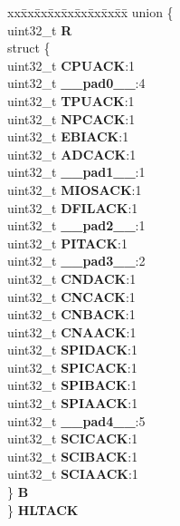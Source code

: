 \begin{DoxyCompactItemize}
\begin{tabbing}
\end{tabbing}\item 
\mbox{\label{structSIU__tag_ae1338aae75922f1d1cc332f99dc2864f}} 
\begin{tabbing}
xx\=xx\=xx\=xx\=xx\=xx\=xx\=xx\=xx\=\kill
union \{\\
\>uint32\_t {\bfseries R}\\
\>struct \{\\
\>\>uint32\_t {\bfseries CPUACK}:1\\
\>\>uint32\_t {\bfseries \_\_pad0\_\_}:4\\
\>\>uint32\_t {\bfseries TPUACK}:1\\
\>\>uint32\_t {\bfseries NPCACK}:1\\
\>\>uint32\_t {\bfseries EBIACK}:1\\
\>\>uint32\_t {\bfseries ADCACK}:1\\
\>\>uint32\_t {\bfseries \_\_pad1\_\_}:1\\
\>\>uint32\_t {\bfseries MIOSACK}:1\\
\>\>uint32\_t {\bfseries DFILACK}:1\\
\>\>uint32\_t {\bfseries \_\_pad2\_\_}:1\\
\>\>uint32\_t {\bfseries PITACK}:1\\
\>\>uint32\_t {\bfseries \_\_pad3\_\_}:2\\
\>\>uint32\_t {\bfseries CNDACK}:1\\
\>\>uint32\_t {\bfseries CNCACK}:1\\
\>\>uint32\_t {\bfseries CNBACK}:1\\
\>\>uint32\_t {\bfseries CNAACK}:1\\
\>\>uint32\_t {\bfseries SPIDACK}:1\\
\>\>uint32\_t {\bfseries SPICACK}:1\\
\>\>uint32\_t {\bfseries SPIBACK}:1\\
\>\>uint32\_t {\bfseries SPIAACK}:1\\
\>\>uint32\_t {\bfseries \_\_pad4\_\_}:5\\
\>\>uint32\_t {\bfseries SCICACK}:1\\
\>\>uint32\_t {\bfseries SCIBACK}:1\\
\>\>uint32\_t {\bfseries SCIAACK}:1\\
\>\} {\bfseries B}\\
\} {\bfseries HLTACK}\\


\end{tabbing}
\end{DoxyCompactItemize}
